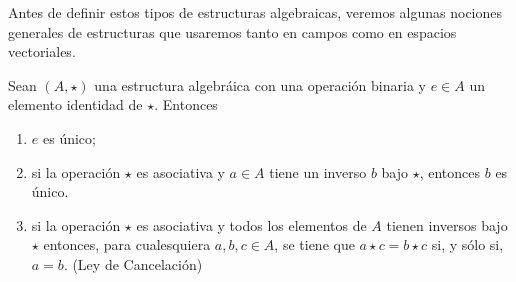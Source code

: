 \documentclass[apuntes]{subfiles}
\begin{document}
Antes de definir estos tipos de estructuras algebraicas, veremos algunas nociones generales de estructuras que usaremos tanto en campos como en espacios vectoriales.
    
\begin{Prop}\label{prop:1.2}
    Sean $(A,\star)$ una estructura algebráica con una operación binaria y $e\in A$ un elemento identidad de $\star$. Entonces

    \begin{enumerate}[label=(\alph*)]
        \item $e$ es único;

        \item si la operación $\star$ es asociativa y $a\in A$ tiene un inverso $b$ bajo $\star$, entonces $b$ es único.

        \item si la operación $\star$ es asociativa y todos los elementos de $A$ tienen inversos bajo $\star$ entonces, para cualesquiera $a,b,c\in A$, se tiene que $a\star c=b\star c$ si, y sólo si, $a=b$. (Ley de Cancelación)
    \end{enumerate}
\end{Prop}
    
\end{document}
